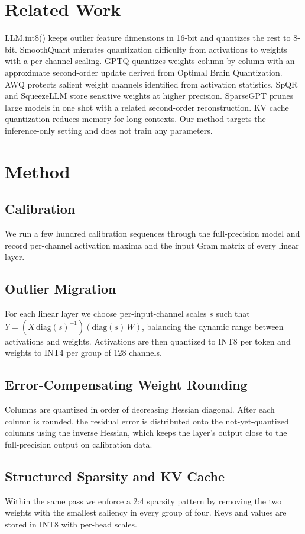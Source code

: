 \documentclass{article}
\begin{document}
\section{Related Work}
LLM.int8() keeps outlier feature dimensions in 16-bit and quantizes the rest
to 8-bit. SmoothQuant migrates quantization difficulty from activations to
weights with a per-channel scaling. GPTQ quantizes weights column by column
with an approximate second-order update derived from Optimal Brain
Quantization. AWQ protects salient weight channels identified from activation
statistics. SpQR and SqueezeLLM store sensitive weights at higher precision.
SparseGPT prunes large models in one shot with a related second-order
reconstruction. KV cache quantization reduces memory for long contexts. Our
method targets the inference-only setting and does not train any parameters.

\section{Method}
\subsection{Calibration}
We run a few hundred calibration sequences through the full-precision model
and record per-channel activation maxima and the input Gram matrix of every
linear layer.

\subsection{Outlier Migration}
For each linear layer we choose per-input-channel scales $s$ such that
$Y = (X\,\mathrm{diag}(s)^{-1})(\mathrm{diag}(s)\,W)$, balancing the dynamic
range between activations and weights. Activations are then quantized to INT8
per token and weights to INT4 per group of 128 channels.

\subsection{Error-Compensating Weight Rounding}
Columns are quantized in order of decreasing Hessian diagonal. After each
column is rounded, the residual error is distributed onto the not-yet-quantized
columns using the inverse Hessian, which keeps the layer's output close to the
full-precision output on calibration data.

\subsection{Structured Sparsity and KV Cache}
Within the same pass we enforce a 2:4 sparsity pattern by removing the two
weights with the smallest saliency in every group of four. Keys and values are
stored in INT8 with per-head scales.
\end{document}
